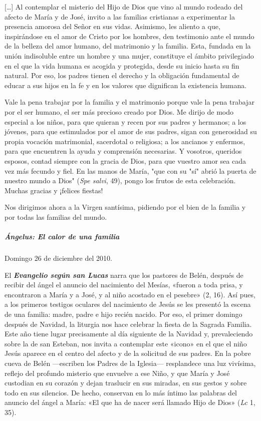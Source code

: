 \documentclass[]{article}
\let\oldsubparagraph\subparagraph
\renewcommand{\subparagraph}[1]{\oldsubparagraph{#1}\mbox{}}
\begin{document}
[\ldots{}] Al contemplar el misterio del Hijo de Dios que vino al mundo
rodeado del afecto de María y de José, invito a las familias cristianas
a experimentar la presencia amorosa del Señor en sus vidas. Asimismo,
les aliento a que, inspirándose en el amor de Cristo por los hombres,
den testimonio ante el mundo de la belleza del amor humano, del
matrimonio y la familia. Esta, fundada en la unión indisoluble entre un
hombre y una mujer, constituye el ámbito privilegiado en el que la vida
humana es acogida y protegida, desde su inicio hasta su fin natural. Por
eso, los padres tienen el derecho y la obligación fundamental de educar
a sus hijos en la fe y en los valores que dignifican la existencia
humana.

Vale la pena trabajar por la familia y el matrimonio porque vale la pena
trabajar por el ser humano, el ser más precioso creado por Dios. Me
dirijo de modo especial a los niños, para que quieran y recen por sus
padres y hermanos; a los jóvenes, para que estimulados por el amor de
sus padres, sigan con generosidad su propia vocación matrimonial,
sacerdotal o religiosa; a los ancianos y enfermos, para que encuentren
la ayuda y comprensión necesarias. Y vosotros, queridos esposos, contad
siempre con la gracia de Dios, para que vuestro amor sea cada vez más
fecundo y fiel. En las manos de María, "que con su "sí" abrió la puerta
de nuestro mundo a Dios" (\emph{Spe salvi}, 49), pongo los frutos de
esta celebración. Muchas gracias y ¡felices fiestas!

Nos dirigimos ahora a la Virgen santísima, pidiendo por el bien de la
familia y por todas las familias del mundo.

\subparagraph{Ángelus: El calor de una
familia}\label{uxe1ngelus-el-calor-de-una-familia}

Domingo 26 de diciembre del 2010.

El \emph{\textbf{Evangelio según san Lucas}} narra que los pastores de
Belén, después de recibir del ángel el anuncio del nacimiento del
Mesías, «fueron a toda prisa, y encontraron a María y a José, y al niño
acostado en el pesebre» (2, 16). Así pues, a los primeros testigos
oculares del nacimiento de Jesús se les presentó la escena de una
familia: madre, padre e hijo recién nacido. Por eso, el primer domingo
después de Navidad, la liturgia nos hace celebrar la fiesta de la
Sagrada Familia. Este año tiene lugar precisamente al día siguiente de
la Navidad y, prevaleciendo sobre la de san Esteban, nos invita a
contemplar este «icono» en el que el niño Jesús aparece en el centro del
afecto y de la solicitud de sus padres. En la pobre cueva de Belén
---escriben los Padres de la Iglesia--- resplandece una luz vivísima,
reflejo del profundo misterio que envuelve a ese Niño, y que María y
José custodian en su corazón y dejan traslucir en sus miradas, en sus
gestos y sobre todo en sus silencios. De hecho, conservan en lo más
íntimo las palabras del anuncio del ángel a María: «El que ha de nacer
será llamado Hijo de Dios» (\emph{Lc} 1, 35).
\end{document}
